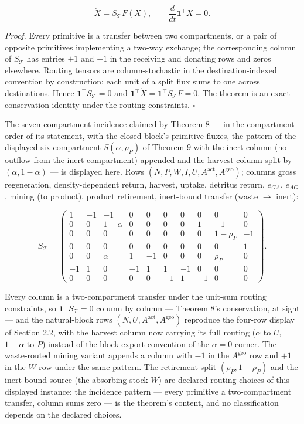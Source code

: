 \documentclass[11pt]{article}
\begin{document}
$$\dot X = S_{\mathcal{T}} F(X), \qquad \frac{d}{dt}\mathbf{1}^\top X = 0.$$



\emph{Proof.} Every primitive is a transfer between two compartments, or a pair of opposite primitives implementing a two-way exchange; the corresponding column of \(S_{\mathcal{T}}\) has entries \(+1\) and \(-1\) in the receiving and donating rows and zeros elsewhere. Routing tensors are column-stochastic in the destination-indexed convention by construction: each unit of a split flux sums to one across destinations. Hence \(\mathbf{1}^\top S_{\mathcal{T}} =\allowbreak{} 0\) and \(\mathbf{1}^\top \dot X =\allowbreak{} \mathbf{1}^\top S_{\mathcal{T}} F =\allowbreak{} 0\). The theorem is an exact conservation identity under the routing constraints. \(\square\)

The seven-compartment incidence claimed by Theorem 8 --- in the compartment order of its statement, with the closed block's primitive fluxes, the pattern of the displayed six-compartment \(S(\alpha, \rho_P)\) of Theorem 9 with the inert column (no outflow from the inert compartment) appended and the harvest column split by \((\alpha, 1-\alpha)\) --- is displayed here. Rows \((N,\allowbreak{} P,\allowbreak{} W,\allowbreak{} I,\allowbreak{} U,\allowbreak{} A^{\mathrm{act}},\allowbreak{} A^{\mathrm{geo}})\); columns gross regeneration, density-dependent return, harvest, uptake, detritus return, \(e_{GA}\), \(e_{AG}\), mining (to product), product retirement, inert-bound transfer (waste \(\to\) inert): 

$$S_{\mathcal{T}} = \begin{pmatrix} 1 & -1 & -1 & 0 & 0 & 0 & 0 & 0 & 0 & 0 \\ 0 & 0 & 1-\alpha & 0 & 0 & 0 & 0 & 1 & -1 & 0 \\ 0 & 0 & 0 & 0 & 0 & 0 & 0 & 0 & 1-\rho_P & -1 \\ 0 & 0 & 0 & 0 & 0 & 0 & 0 & 0 & 0 & 1 \\ 0 & 0 & \alpha & 1 & -1 & 0 & 0 & 0 & \rho_P & 0 \\ -1 & 1 & 0 & -1 & 1 & 1 & -1 & 0 & 0 & 0 \\ 0 & 0 & 0 & 0 & 0 & -1 & 1 & -1 & 0 & 0 \end{pmatrix}.$$

 Every column is a two-compartment transfer under the unit-sum routing constraints, so \(\mathbf{1}^\top S_{\mathcal{T}} =\allowbreak{} 0\) column by column --- Theorem 8's conservation, at sight --- and the natural-block rows \((N,\allowbreak{} U,\allowbreak{} A^{\mathrm{act}},\allowbreak{} A^{\mathrm{geo}})\) reproduce the four-row display of Section 2.2, with the harvest column now carrying its full routing (\(\alpha\) to \(U\), \(1-\alpha\) to \(P\)) instead of the block-export convention of the \(\alpha = 0\) corner. The waste-routed mining variant appends a column with \(-1\) in the \(A^{\mathrm{geo}}\) row and \(+1\) in the \(W\) row under the same pattern. The retirement split \((\rho_P, 1-\rho_P)\) and the inert-bound source (the absorbing stock \(W\)) are declared routing choices of this displayed instance; the incidence pattern --- every primitive a two-compartment transfer, column sums zero --- is the theorem's content, and no classification depends on the declared choices.
\end{document}
